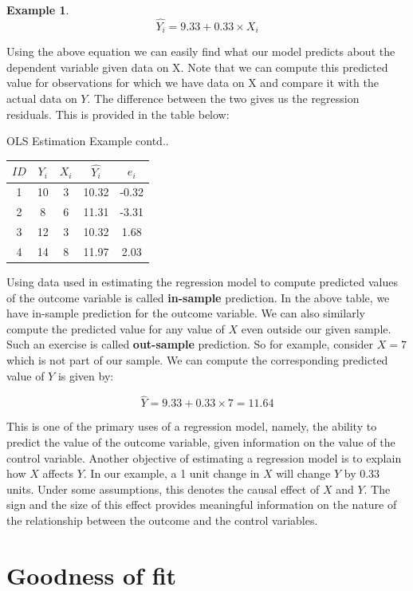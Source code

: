 \documentclass[
]{book}
\theoremstyle{definition}
\theoremstyle{definition}
\newtheorem{example}{Example}[chapter]
\theoremstyle{definition}
\theoremstyle{definition}
\theoremstyle{remark}
\begin{document}
\begin{example}
\[\hat{Y_i} = 9.33 + 0.33 \times X_i \]

Using the above equation we can easily find what our model predicts about the dependent variable given data on X. Note that we can compute this predicted value for observations for which we have data on X and compare it with the actual data on \(Y\). The difference between the two gives us the regression residuals. This is provided in the table below:

\label{tab:ch3table3} OLS Estimation Example contd..

\begin{longtable}[]{@{}ccccc@{}}
\toprule()
\(ID\) & \(Y_i\) & \(X_i\) & \(\hat{Y_i}\) & \(e_i\) \\
\midrule()
\endhead
1 & 10 & 3 & 10.32 & -0.32 \\
2 & 8 & 6 & 11.31 & -3.31 \\
3 & 12 & 3 & 10.32 & 1.68 \\
4 & 14 & 8 & 11.97 & 2.03 \\
\bottomrule()
\end{longtable}

Using data used in estimating the regression model to compute predicted values of the outcome variable is called \textbf{in-sample} prediction. In the above table, we have in-sample prediction for the outcome variable. We can also similarly compute the predicted value for any value of \(X\) even outside our given sample. Such an exercise is called \textbf{out-sample} prediction. So for example, consider \(X=7\) which is not part of our sample. We can compute the corresponding predicted value of \(Y\) is given by:

\[\hat{Y} = 9.33+0.33\times 7= 11.64 \]

This is one of the primary uses of a regression model, namely, the ability to predict the value of the outcome variable, given information on the value of the control variable. Another objective of estimating a regression model is to explain how \(X\) affects \(Y\). In our example, a 1 unit change in \(X\) will change \(Y\) by 0.33 units. Under some assumptions, this denotes the causal effect of \(X\) and \(Y\). The sign and the size of this effect provides meaningful information on the nature of the relationship between the outcome and the control variables.
\end{example}

\hypertarget{goodness-of-fit}{%
\section{Goodness of fit}\label{goodness-of-fit}}
\end{document}
